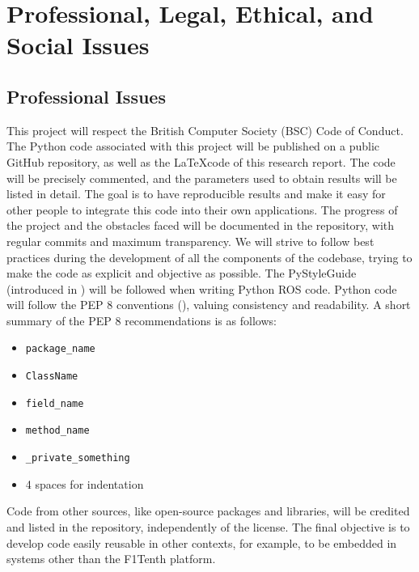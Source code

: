 
\chapter{Professional, Legal, Ethical, and Social Issues} %

\label{Chapter4} %



\section{Professional Issues}
\label{proiss}
This project will respect the British Computer Society (BSC) Code of Conduct. \newline
The Python code associated with this project will be published on a public GitHub repository, as well as the \LaTeX code of this research report. The code will be precisely commented, and the parameters used to obtain results will be listed in detail. The goal is to have reproducible results and make it easy for other people to integrate this code into their own applications.
\newline
The progress of the project and the obstacles faced will be documented in the repository, with regular commits and maximum transparency. We will strive to follow best practices during the development of all the components of the codebase, trying to make the code as explicit and objective as possible. The PyStyleGuide (introduced in \cite{rossyntax}) will be followed when writing Python ROS code. Python code will follow the PEP 8 conventions (\cite{pysyntax}), valuing consistency and readability. A short summary of the PEP 8 recommendations is as follows:
\begin{itemize}
	\item \verb |package_name|
	\item \verb |ClassName|
	\item \verb |field_name|
	\item \verb |method_name|
	\item \verb |_private_something|
	\item 4 spaces for indentation
\end{itemize}

Code from other sources, like open-source packages and libraries, will be credited and listed in the repository, independently of the license.
\newline
The final objective is to develop code easily reusable in other contexts, for example, to be embedded in systems other than the F1Tenth platform.
